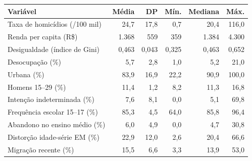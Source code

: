 \begin{tabular}{@{}lrrrrr@{}}
\toprule
\textbf{Variável} & \textbf{Média} & \textbf{DP} & \textbf{Mín.} & \textbf{Mediana} & \textbf{Máx.}\\
\midrule
\rowcolor{fundo}Taxa de homicídios (/100 mil) & 24,7 & 17,8 & 0,7 & 20,4 & 116,0\\
Renda per capita (R\$) & 1.368 & 559 & 359 & 1.384 & 4.300\\
Desigualdade (índice de Gini) & 0,463 & 0,043 & 0,325 & 0,463 & 0,652\\
Desocupação (\%) & 5,7 & 2,8 & 1,0 & 5,2 & 21,0\\
Urbana (\%) & 83,9 & 16,9 & 22,2 & 90,9 & 100,0\\
Homens 15--29 (\%) & 11,4 & 1,2 & 8,2 & 11,3 & 16,8\\
Intenção indeterminada (\%) & 7,6 & 8,1 & 0,0 & 5,1 & 69,8\\
Frequência escolar 15--17 (\%) & 85,3 & 4,5 & 64,0 & 85,8 & 96,4\\
Abandono no ensino médio (\%) & 6,0 & 4,9 & 0,0 & 4,7 & 30,8\\
Distorção idade-série EM (\%) & 22,9 & 12,0 & 2,6 & 20,4 & 66,6\\
Migração recente (\%) & 15,5 & 6,6 & 3,3 & 13,9 & 53,0\\
\bottomrule
\end{tabular}
